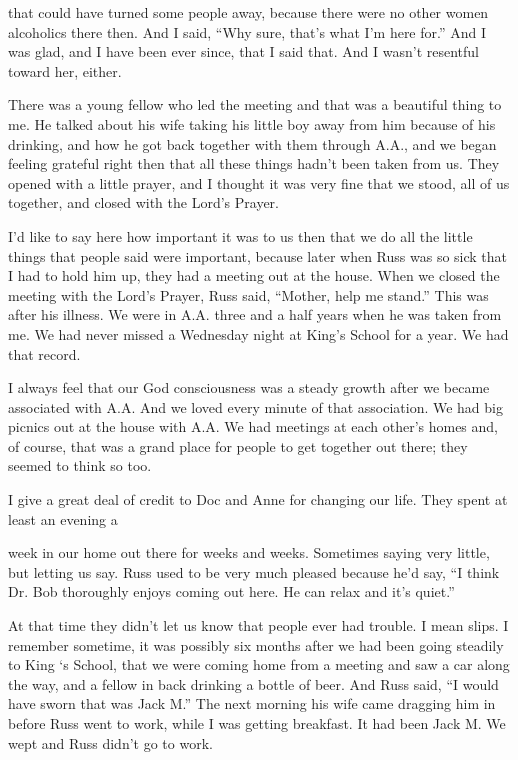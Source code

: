 \begin{biblechapter}
that could have turned some people away, because there were no other women alcoholics there then. And I said, “Why sure, that’s what I’m here for.” And I was glad, and I have been ever since, that I said that. And I wasn’t resentful toward her, either.

There was a young fellow who led the meeting and that was a beautiful thing to me. He talked about his wife taking his little boy away from him because of his drinking, and how he got back together with them through A.A., and we began feeling grateful right then that all these things hadn’t been taken from us. They opened with a little prayer, and I thought it was very fine that we stood, all of us together, and closed with the Lord’s Prayer.

I’d like to say here how important it was to us then that we do all the little things that people said were important, because later when Russ was so sick that I had to hold him up, they had a meeting out at the house. When we closed the meeting with the Lord’s Prayer, Russ said, “Mother, help me stand.” This was after his illness. We were in A.A. three and a half years when he was taken from me. We had never missed a Wednesday night at King’s School for a year. We had that record.

I always feel that our God consciousness was a steady growth after we became associated with A.A. And we loved every minute of that association. We had big picnics out at the house with A.A. We had meetings at each other’s homes and, of course, that was a grand place for people to get together out there; they seemed to think so too.

I give a great deal of credit to Doc and Anne for changing our life. They spent at least an evening a

week in our home out there for weeks and weeks. Sometimes saying very little, but letting us say. Russ used to be very much pleased because he’d say, “I think Dr. Bob thoroughly enjoys coming out here. He can relax and it’s quiet.”

At that time they didn’t let us know that people ever had trouble. I mean slips. I remember sometime, it was possibly six months after we had been going steadily to King ‘s School, that we were coming home from a meeting and saw a car along the way, and a fellow in back drinking a bottle of beer. And Russ said, “I would have sworn that was Jack M.” The next morning his wife came dragging him in before Russ went to work, while I was getting breakfast. It had been Jack M. We wept and Russ didn’t go to work.


\end{biblechapter}
